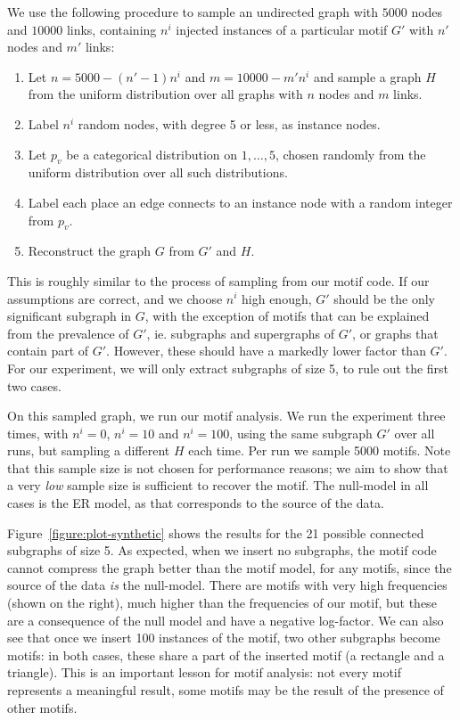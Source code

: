 We use the following procedure to sample an undirected graph with $5000$ nodes and $10000$ links, containing $n^i$ injected instances of a particular motif $G'$ with $n'$ nodes and $m'$ links:

\begin{enumerate}
  \item Let $n = 5000 - (n'-1)n^i$ and $m = 10000 - m'n^i$ and sample a graph $H$ from the uniform distribution over all graphs with $n$ nodes and $m$ links.   
  \item Label $n^i$ random nodes, with degree 5 or less, as instance nodes.
  \item Let $p_v$ be a categorical distribution on ${1, \ldots, 5}$, chosen randomly from the uniform distribution over all such distributions.
  \item Label each place an edge connects to an instance node with a random integer from $p_v$.
  \item Reconstruct the graph $G$ from $G'$ and $H$.
\end{enumerate}

This is roughly similar to the process of sampling from our motif code. If our assumptions are correct, and we choose $n^i$ high enough, $G'$ should be the only significant subgraph in $G$, with the exception of motifs that can be explained from the prevalence of $G'$, ie. subgraphs and supergraphs of $G'$, or graphs that contain part of $G'$. However, these should have a markedly lower factor than $G'$. For our experiment, we will only extract subgraphs of size 5, to rule out the first two cases.

On this sampled graph, we run our motif analysis. We run the experiment three times, with $n^i = 0$, $n^i = 10$ and $n^i = 100$, using the same subgraph $G'$ over all runs, but sampling a different $H$ each time. Per run we sample 5000 motifs. Note that this  sample size is not chosen for performance reasons; we aim to show that a very \emph{low} sample size is sufficient to recover the motif. The null-model in all cases is the ER model, as that corresponds to the source of the data.

Figure~\ref{figure:plot-synthetic} shows the results for the 21 possible connected subgraphs of size 5. As expected, when we insert no subgraphs, the motif code cannot compress the graph better than the motif model, for any motifs, since the source of the data \emph{is} the null-model. There are motifs with very high frequencies (shown on the right), much higher than the frequencies of our motif, but these are a consequence of the null model and have a negative log-factor. We can also see that once we insert 100 instances of the motif, two other subgraphs become motifs: in both cases, these share a part of the inserted motif (a rectangle and a triangle). This is an important lesson for motif analysis: not every motif represents a meaningful result, some motifs may be the result of the presence of other motifs. 

